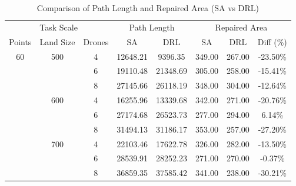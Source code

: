 \documentclass[AutoFakeBold]{LZUThesis}
\begin{document}
\begin{table}[H]
	\centering
	\caption{Comparison of Path Length and Repaired Area (SA vs DRL)}
	\begin{tabular}{cccccccc}
		\toprule
		\multicolumn{3}{c}{Task Scale} & \multicolumn{2}{c}{Path Length} & \multicolumn{3}{c}{Repaired Area}                                                     \\
		\cmidrule(lr){1-3} \cmidrule(lr){4-5} \cmidrule(lr){6-8}
		Points                         & Land Size                       & Drones                            & SA       & DRL      & SA     & DRL    & Diff (\%) \\
		\midrule
		\multirow{9}{*}{60}            & \multirow{3}{*}{500}            & 4                                 & 12648.21 & 9396.35  & 349.00 & 267.00 & -23.50\%  \\
		                               &                                 & 6                                 & 19110.48 & 21348.69 & 305.00 & 258.00 & -15.41\%  \\
		                               &                                 & 8                                 & 27145.66 & 26118.19 & 348.00 & 304.00 & -12.64\%  \\
		                               & \multirow{3}{*}{600}            & 4                                 & 16255.96 & 13339.68 & 342.00 & 271.00 & -20.76\%  \\
		                               &                                 & 6                                 & 27174.68 & 26523.73 & 277.00 & 294.00 & 6.14\%    \\
		                               &                                 & 8                                 & 31494.13 & 31186.17 & 353.00 & 257.00 & -27.20\%  \\
		                               & \multirow{3}{*}{700}            & 4                                 & 22103.46 & 17622.78 & 326.00 & 282.00 & -13.50\%  \\
		                               &                                 & 6                                 & 28539.91 & 28252.23 & 271.00 & 270.00 & -0.37\%   \\
		                               &                                 & 8                                 & 36859.35 & 37585.42 & 341.00 & 238.00 & -30.21\%  \\
		\bottomrule
	\end{tabular}
	\label{tab:combined_comparison}
\end{table}
\end{document}
